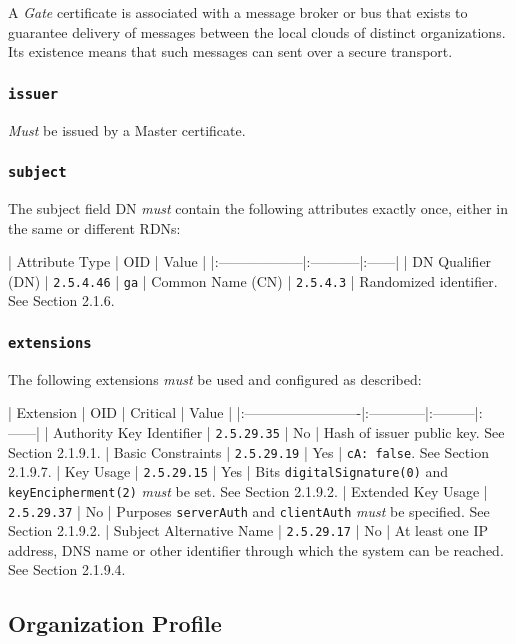 A \textit{Gate} certificate is associated with a message broker or bus that exists to guarantee delivery of messages between the local clouds of distinct organizations.
Its existence means that such messages can sent over a secure transport.

\subsubsection{\texttt{issuer}}

\textit{Must} be issued by a Master certificate.

\subsubsection{\texttt{subject}}

The subject field DN \textit{must} contain the following attributes exactly once, either in the same or different RDNs:

| Attribute Type    | OID        | Value |
|:------------------|:-----------|:------|
| DN Qualifier (DN) | \texttt{2.5.4.46} | \texttt{ga}
| Common Name (CN)  | \texttt{2.5.4.3}  | Randomized identifier. See Section 2.1.6.

\subsubsection{\texttt{extensions}}

The following extensions \textit{must} be used and configured as described:

| Extension                | OID         | Critical | Value |
|:-------------------------|:------------|:---------|:------|
| Authority Key Identifier | \texttt{2.5.29.35} | No       | Hash of issuer public key. See Section 2.1.9.1.
| Basic Constraints        | \texttt{2.5.29.19} | Yes      | \texttt{cA: false}. See Section 2.1.9.7.
| Key Usage                | \texttt{2.5.29.15} | Yes      | Bits \texttt{digitalSignature(0)} and \texttt{keyEncipherment(2)} \textit{must} be set. See Section 2.1.9.2.
| Extended Key Usage       | \texttt{2.5.29.37} | No       | Purposes \texttt{serverAuth} and \texttt{clientAuth} \textit{must} be specified. See Section 2.1.9.2.
| Subject Alternative Name | \texttt{2.5.29.17} | No       | At least one IP address, DNS name or other identifier through which the system can be reached. See Section 2.1.9.4.

\subsection{Organization Profile}

